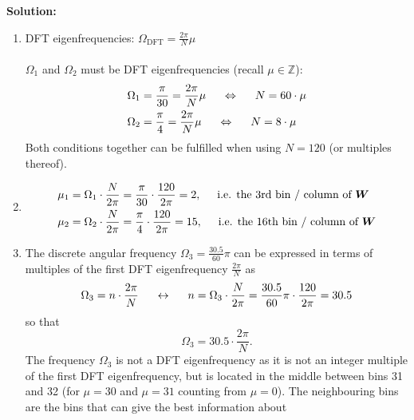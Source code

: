\documentclass[11pt,a4paper,DIV=12]{scrartcl}
\begin{document}
\begin{Loesung}
\textbf{Solution:}
\begin{enumerate}[label=\alph*)]
	\item DFT eigenfrequencies: $\Omega_\text{DFT}=\frac{2\pi}{N}\mu$\\\\
	$\Omega_1$ and $\Omega_2$ must be DFT eigenfrequencies (recall $\mu\in\mathbb{Z}$):
%
	\begin{align}
	\Omega_1&=\frac{\pi}{30}=\frac{2\pi}{N}\mu \hspace{5mm}\Leftrightarrow\hspace{5mm} N=60\cdot\mu\nonumber\\
	\Omega_2&=\frac{\pi}{4}=\frac{2\pi}{N}\mu \hspace{5mm}\Leftrightarrow\hspace{5mm} N=8\cdot\mu\nonumber
	\end{align}
%
	Both conditions together can be fulfilled when using $N=120$ (or multiples thereof).
%
	\item \begin{align}
	\mu_1&=\Omega_1\cdot\frac{N}{2\pi}=\frac{\pi}{30}\cdot\frac{120}{2\pi}=2, \hspace{5mm}\text{i.e. the 3rd bin / column of } \bm W\nonumber\\
	\mu_2&=\Omega_2\cdot\frac{N}{2\pi}=\frac{\pi}{4}\cdot\frac{120}{2\pi}=15, \hspace{5mm}\text{i.e. the 16th bin / column of } \bm W\nonumber
	\end{align}
%
	\item The discrete angular frequency $\Omega_3=\frac{30.5}{60}\pi$ can be
	expressed in terms of multiples of the first DFT eigenfrequency
	$\frac{2\pi}{N}$ as
%
	\begin{equation}
	\Omega_3=n\cdot\frac{2\pi}{N} \hspace{5mm}\leftrightarrow\hspace{5mm} n=\Omega_3\cdot\frac{N}{2\pi}=\frac{30.5}{60}\pi\cdot\frac{120}{2\pi}=30.5\nonumber
	\end{equation}
%
	so that
%
	\begin{equation}
	\Omega_3=30.5\cdot\frac{2\pi}{N}.\nonumber
	\end{equation}
%
	The frequency $\Omega_3$ is not a DFT eigenfrequency as it is not an integer
	multiple of the first DFT eigenfrequency, but is located in the middle between
	bins 31 and 32 (for $\mu=30$ and $\mu=31$ counting from $\mu=0$).
%
	The neighbouring bins are the bins that can give the best information about

\end{enumerate}
\end{Loesung}
\end{document}

